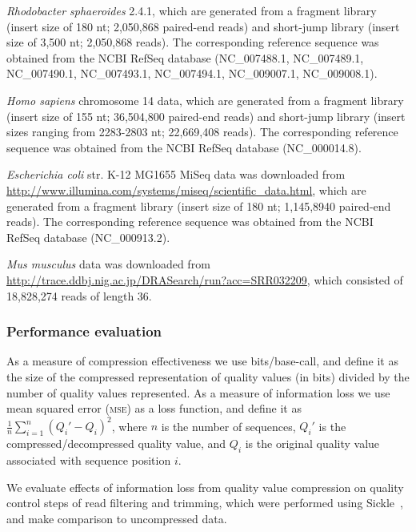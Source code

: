 \documentclass[12pt,\mydriver]{thesis}
\begin{document}
\textit{Rhodobacter sphaeroides} 2.4.1, which are generated from a
fragment library (insert size of 180 nt; 2,050,868 paired-end reads)
and short-jump library (insert size of 3,500 nt; 2,050,868 reads). The
corresponding reference sequence was obtained from the NCBI RefSeq
database (NC\_007488.1, NC\_007489.1, NC\_007490.1, NC\_007493.1,
NC\_007494.1, NC\_009007.1, NC\_009008.1).


\textit{Homo sapiens} chromosome 14 data, which are generated from a
fragment library (insert size of 155 nt; 36,504,800 paired-end reads)
and short-jump library (insert sizes ranging from 2283-2803 nt;
22,669,408 reads). The corresponding reference sequence was obtained
from the NCBI RefSeq database (NC\_000014.8).

\textit{Escherichia coli} str. K-12 MG1655 MiSeq data was downloaded
from \url{http://www.illumina.com/systems/miseq/scientific_data.html},
which are generated from a fragment library (insert size of 180 nt;
1,145,8940 paired-end reads). The corresponding reference sequence
was obtained from the NCBI RefSeq database (NC\_000913.2).

\textit{Mus musculus} data was downloaded from
\url{http://trace.ddbj.nig.ac.jp/DRASearch/run?acc=SRR032209}, which
consisted of 18,828,274 reads of length 36.



\subsubsection{Performance evaluation}

As a measure of compression effectiveness we use bits/base-call, and
define it as the size of the compressed representation of quality
values (in bits) divided by the number of quality values represented.
As a measure of information loss we use mean squared error
(\textsc{mse}) as a loss function, and define it as
$\frac{1}{n}\sum_{i=1}^{n}{(Q_i'-Q_i)^2}$, where $n$ is the number of
sequences, $Q_i'$ is the compressed/decompressed quality value, and
$Q_i$ is the original quality value associated with sequence position
$i$.

We evaluate effects of information loss from quality value compression
on quality control steps of read filtering and trimming, which were
performed using Sickle~\cite{sickle}, and make comparison to
uncompressed data.
\end{document}
